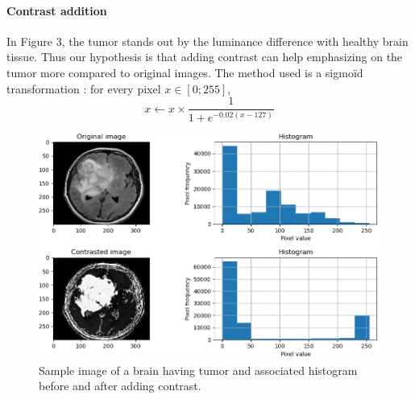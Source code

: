 \documentclass[conference]{IEEEtran}
\begin{document}
\paragraph*{Contrast addition}
In Figure 3, the tumor stands out by the luminance difference with healthy brain tissue. Thus our hypothesis is that adding contrast can help emphasizing on the tumor more compared to original images. The method used is a sigmoïd transformation : for every pixel $x \in [0;255]$, $$x\leftarrow x\times \frac{1}{1+e^{-0.02(x-127)}}$$
\begin{figure}[h]
\centering
\includegraphics[scale=0.33]{figures/Contrasting.png}
\caption{Sample image of a brain having tumor and associated histogram before and after adding contrast.}
\end{figure}
\end{document}
